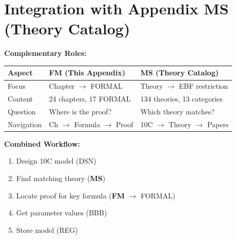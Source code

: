 \section{Integration with Appendix MS (Theory Catalog)}
\label{sec:fm-ms-integration}

\begin{tcolorbox}[colback=purple!3!white, colframe=purple!60!black,
    title=\textbf{FM $\leftrightarrow$ MS Integration}]

\textbf{Complementary Roles:}

\begin{center}
\begin{tabular}{|l|l|l|}
\hline
\textbf{Aspect} & \textbf{FM (This Appendix)} & \textbf{MS (Theory Catalog)} \\
\hline
\hline
Focus & Chapter $\rightarrow$ FORMAL & Theory $\rightarrow$ EBF restriction \\
Content & 24 chapters, 17 FORMAL & 134 theories, 13 categories \\
Question & Where is the proof? & Which theory matches? \\
Navigation & Ch $\rightarrow$ Formula $\rightarrow$ Proof & 10C $\rightarrow$ Theory $\rightarrow$ Papers \\
\hline
\end{tabular}
\end{center}

\vspace{0.5em}

\textbf{Combined Workflow:}
\begin{enumerate}[nosep]
    \item Design 10C model (DSN)
    \item Find matching theory (\textbf{MS})
    \item Locate proof for key formula (\textbf{FM} $\rightarrow$ FORMAL)
    \item Get parameter values (BBB)
    \item Store model (REG)
\end{enumerate}

\end{tcolorbox}

